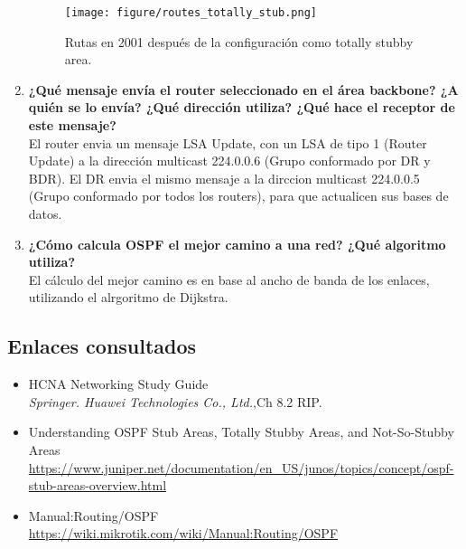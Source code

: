 \documentclass[letterpaper,12pt]{article}
\begin{document}
\begin{enumerate}
\begin{figure}[H]
			\centering \texttt{[image: figure/routes\_totally\_stub.png]}
			\caption{
					\label{fig:samplesetup} %
					Rutas en 2001 después de la configuración como totally stubby area.
			}
		\end{figure}
		\item \textbf{¿Qué mensaje envía el router seleccionado en el área backbone? ¿A
		quién se lo envía? ¿Qué dirección utiliza? ¿Qué hace el receptor de
		este mensaje?}\\
		El router envia un mensaje LSA Update, con un LSA de tipo 1 (Router Update) a la dirección multicast 224.0.0.6 (Grupo conformado por DR y BDR). El DR envia el mismo mensaje a la dirccion multicast 224.0.0.5 (Grupo conformado por todos los routers), para que actualicen sus bases de datos.
		\item \textbf{¿Cómo calcula OSPF el mejor camino a una red? ¿Qué algoritmo
		utiliza?}\\
		El cálculo del mejor camino es en base al ancho de banda de los enlaces, utilizando el alrgoritmo de Dijkstra.


	\end{enumerate}

	\subsection{Enlaces consultados}
		\begin{itemize}
			\item{HCNA Networking Study Guide}  \\
			\textit{Springer. Huawei Technologies Co., Ltd.},Ch 8.2 RIP.
			\item{Understanding OSPF Stub Areas, Totally Stubby Areas, and Not-So-Stubby Areas}  \\
			\url{https://www.juniper.net/documentation/en_US/junos/topics/concept/ospf-stub-areas-overview.html}
			\item{Manual:Routing/OSPF}  \\
			\url{https://wiki.mikrotik.com/wiki/Manual:Routing/OSPF}
		\end{itemize}
\end{document}
